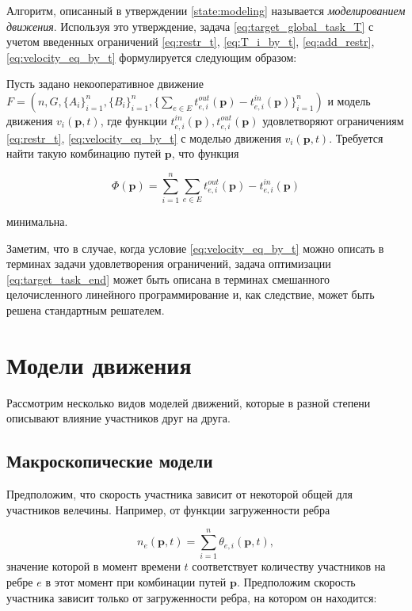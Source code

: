 \documentclass[12pt, a4paper]{article}
\begin{document}
Алгоритм, описанный в утверждении \eqref{state:modeling} называется \textit{моделированием движения}. Используя это утверждение, задача \eqref{eq:target_global_task_T} с учетом введенных ограничений \eqref{eq:restr_t}, \eqref{eq:T_i_by_t}, \eqref{eq:add_restr}, \eqref{eq:velocity_eq_by_t} формулируется следующим образом:

Пусть задано некооперативное движение $F = (n, G, \{A_i\}_{i = 1}^{n}, \{B_i\}_{i = 1}^{n}, \{\sum \limits_{e \in E} t_{e, i}^{out}(\textbf{p}) - t_{e, i}^{in}(\textbf{p})\}_{i = 1}^{n})$ и модель движения $v_i(\textbf{p}, t)$, где функции $t_{e, i}^{in}(\textbf{p}), t_{e, i}^{out}(\textbf{p})$ удовлетворяют ограничениям \eqref{eq:restr_t}, \eqref{eq:velocity_eq_by_t} с моделью движения $v_i(\textbf{p}, t)$. Требуется найти такую комбинацию путей $\textbf{p}$, что функция 

\begin{equation}
\label{eq:target_task_end}
\Phi(\textbf{p}) =\sum \limits_{i = 1}^n \sum \limits_{e \in E} t_{e, i}^{out}(\textbf{p}) - t_{e, i}^{in}(\textbf{p})
\end{equation}

минимальна.

Заметим, что в случае, когда условие \eqref{eq:velocity_eq_by_t} можно описать в терминах задачи удовлетворения ограничений, задача оптимизации \eqref{eq:target_task_end} может быть описана в терминах смешанного целочисленного линейного программирование и, как следствие, может быть решена стандартным решателем.

\newpage
\section{Модели движения}

Рассмотрим несколько видов моделей движений, которые в разной степени описывают влияние участников друг на друга.

\subsection{Макроскопические модели}

Предположим, что скорость участника зависит от некоторой общей для участников велечины. Например, от функции загруженности ребра

$$ n_{e}(\textbf{p}, t) = \sum\limits_{i = 1}^n\theta_{e, i}(\textbf{p}, t),$$
значение которой в момент времени $t$ соответствует количеству участников на ребре $e$ в этот момент при комбинации путей $\textbf{p}$. Предположим скорость участника зависит только от загруженности ребра, на котором он находится:
\end{document}
